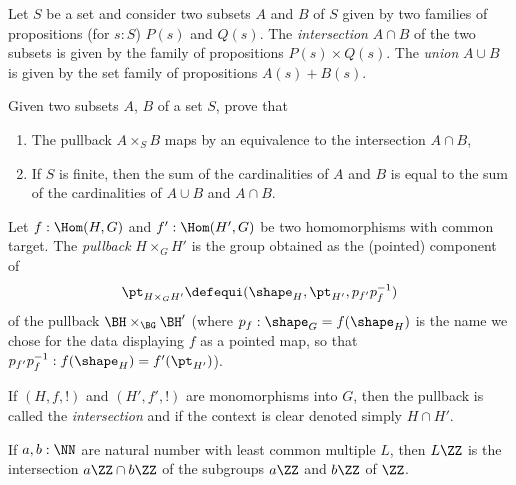 \begin{definition}
  \label{def:intersectionand unionofsets}
  Let $S$ be a set and consider two subsets $A$ and $B$ of $S$ given by two families of propositions (for $s:S$) $P(s)$ and $Q(s)$.  The \emph{intersection} $A\cap B$ of the two subsets is given by the family of propositions $P(s)\times Q(s)$.  The \emph{union} $A\cup B$ is given by the set family of propositions $A(s)+B(s)$.
\end{definition}
\begin{xca}
  \label{xca:intersectionpullbackofsets}
  Given two subsets $A$, $B$ of a set $S$, prove that
  \begin{enumerate}
  \item The pullback $A\times_SB$ maps by an equivalence to the intersection $A\cap B$,
  \item\label{xca:cardinalityintersectionunion}
    If $S$ is finite, then the sum of the cardinalities of $A$ and $B$ is equal to the sum of the cardinalities of $A\cup B$ and $A\cap B$.\qedhere
  \end{enumerate}
\end{xca} 

\begin{definition}
  \label{def:intersectionofgroups}
  Let $f:\Hom(H,G)$ and $f':\Hom(H',G)$ be two homomorphisms with common target.  The \emph{pullback} $H\times_GH'$ is the group obtained as the (pointed) component of
$$\pt_{H\times_GH'}\defequi(\shape_H,\pt_{H'},p_{f'}p_f^{-1})$$ of the pullback $\BH\times_{\BG}\BH'$ (where $p_f:\shape_G=f(\shape_H)$ is the name we chose for the data displaying $f$ as a pointed map, so that $p_{f'}p_f^{-1}:f(\shape_H)=f'(\pt_{H'})$).

If $(H,f,!)$ and $(H',f',!)$ are monomorphisms into $G$, then the pullback is called the \emph{intersection} and if the context is clear denoted simply $H\cap H'$.
\end{definition}
\begin{example}
  If $a,b:\NN$ are natural number with least common multiple $L$, then $L\ZZ$ is the intersection $a\ZZ\cap b\ZZ$ of the subgroups $a\ZZ$ and $b\ZZ$ of $\ZZ$.
\end{example}

